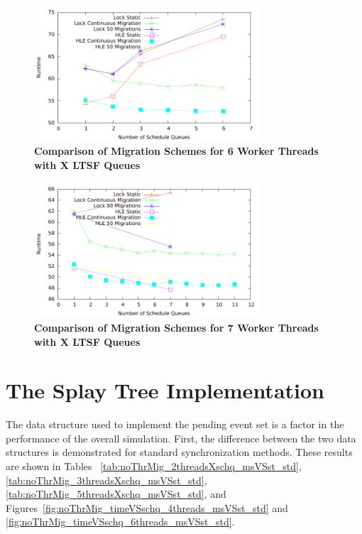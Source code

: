 \documentclass[11pt]{book}
\begin{document}
\begin{figure}[H]
    \centering
    \graphicspath{ {./figures/} }
    \includegraphics[width=0.75\textwidth,keepaspectratio]{migComp_6threads}
    \caption{\textbf{Comparison of Migration Schemes for 6 Worker Threads with X LTSF
        Queues}}\label{fig:migComp_6threads}
\end{figure}

\begin{figure}[H]
    \centering
    \graphicspath{ {./figures/} }
    \includegraphics[width=0.75\textwidth,keepaspectratio]{migComp_7threads}
    \caption{\textbf{Comparison of Migration Schemes for 7 Worker Threads with X LTSF
        Queues}}\label{fig:migComp_7threads}
\end{figure}

\section{The Splay Tree Implementation}

The data structure used to implement the pending event set is a factor in the performance
of the overall simulation.  First, the difference between the two data structures is
demonstrated for standard synchronization methods.  These results are shown in Tables
~\ref{tab:noThrMig_2threadsXschq_msVSst_std}, \ref{tab:noThrMig_3threadsXschq_msVSst_std},
\ref{tab:noThrMig_5threadsXschq_msVSst_std}, and
Figures~\ref{fig:noThrMig_timeVSschq_4threads_msVSst_std} and
\ref{fig:noThrMig_timeVSschq_6threads_msVSst_std}.
\end{document}
